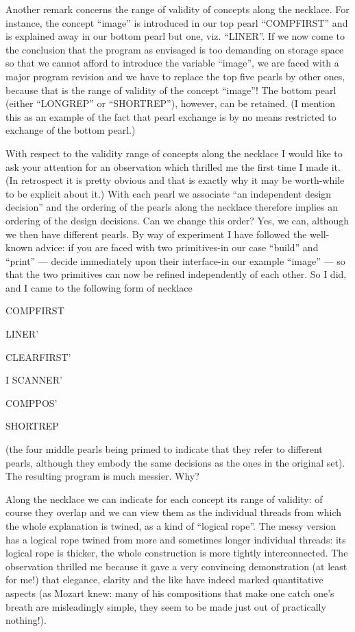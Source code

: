 Another remark concerns the range of validity of concepts along the necklace. For instance, the concept ``image'' is introduced in our top pearl ``COMPFIRST'' and is explained away in our bottom pearl but one, viz. ``LINER''. If we now come to the conclusion that the program as envisaged is too demanding on storage space so that we cannot afford to introduce the variable ``image'', we are faced with a major program revision and we have to replace the top five pearls by other ones, because that is the range of validity of the concept ``image''! The bottom pearl (either ``LONGREP'' or ``SHORTREP''), however, can be retained. (I mention this as an example of the fact that pearl exchange is by no means restricted to exchange of the bottom pearl.)

With respect to the validity range of concepts along the necklace I would like to ask your attention for an observation which thrilled me the first time I made it. (In retrospect it is pretty obvious and that is exactly why it may be worth-while to be explicit about it.) With each pearl we associate ``an independent design decision'' and the ordering of the pearls along the necklace therefore implies an ordering of the design decisions. Can we change this order? Yes, we can, although we then have different pearls. By way of experiment I have followed the well-known advice: if you are faced with two primitives-in our case ``build'' and ``print'' --- decide immediately upon their interface-in our example ``image'' --- so that the two primitives can now be refined independently of each other. So I did, and I came to the following form of necklace

COMPFIRST

LINER'

CLEARFIRST'

I SCANNER'

COMPPOS'

SHORTREP

\noindent
(the four middle pearls being primed to indicate that they refer to different pearls, although they embody the same decisions as the ones in the original set). The resulting program is much messier. Why?

Along the necklace we can indicate for each concept its range of validity: of course they overlap and we can view them as the individual threads from which the whole explanation is twined, as a kind of ``logical rope''. The messy version has a logical rope twined from more and sometimes longer individual threads: its logical rope is thicker, the whole construction is more tightly interconnected. The observation thrilled me because it gave a very convincing demonstration (at least for me!) that elegance, clarity and the like have indeed marked quantitative aspects (as Mozart knew: many of his compositions that make one catch one's breath are misleadingly simple, they seem to be made just out of practically nothing!).

